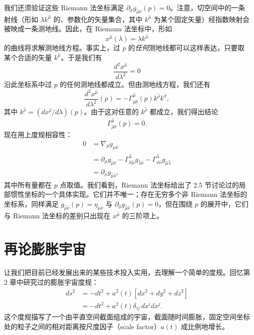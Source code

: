 我们还须验证这些 Riemann 法坐标满足 $\partial_{\hat\sigma}g_{\hat\mu\hat\nu}(p) = 0$。注意，切空间中的一条射线（形如 $\lambda k^{\hat\mu}$ 的、参数化的矢量集合，其中 $k^{\hat\mu}$ 为某个固定矢量）经指数映射会被映成一条测地线。因此，在 Riemann 法坐标中，形如
\begin{equation*}
x^{\hat\mu}(\lambda) = \lambda k^{\hat\mu}
\tag{3.67}
\end{equation*}
的曲线将求解测地线方程。事实上，过 $p$ 的\emph{任何}测地线都可以这样表达，只要取某个合适的矢量 $k^{\hat\mu}$。于是我们有
\begin{equation*}
\frac{d^2x^{\hat\mu}}{d\lambda^2} = 0
\tag{3.68}
\end{equation*}
沿此坐标系中过 $p$ 的任何测地线都成立。但由测地线方程，我们还有
\begin{equation*}
\frac{d^2x^{\hat\mu}}{d\lambda^2}(p) = -\Gamma^{\hat\mu}_{\hat\rho\hat\sigma}(p)k^{\hat\rho}k^{\hat\sigma},
\tag{3.69}
\end{equation*}
其中 $k^{\hat\rho} = (dx^{\hat\rho}/d\lambda)(p)$。由于这对任意的 $k^{\hat\rho}$ 都成立，我们得出结论
\begin{equation*}
\Gamma^{\hat\mu}_{\hat\rho\hat\sigma}(p) = 0.
\tag{3.70}
\end{equation*}
现在用上度规相容性：
\begin{align*}
0 &= \nabla_{\hat\sigma}g_{\hat\mu\hat\nu}\\
&= \partial_{\hat\sigma}g_{\hat\mu\hat\nu} - \Gamma^{\hat\lambda}_{\hat\sigma\hat\mu}g_{\hat\lambda\hat\nu} - \Gamma^{\hat\lambda}_{\hat\sigma\hat\nu}g_{\hat\mu\hat\lambda}\\
&= \partial_{\hat\sigma}g_{\hat\mu\hat\nu},
\tag{3.71}
\end{align*}
其中所有量都在 $p$ 点取值。我们看到，Riemann 法坐标给出了 2.5 节讨论过的局部惯性坐标的一个具体实现。它们并不唯一；存在无穷多个非 Riemann 法坐标的坐标系，同样满足 $g_{\hat\mu\hat\nu}(p) = \eta_{\hat\mu\hat\nu}$ 与 $\partial_{\hat\sigma}g_{\hat\mu\hat\nu}(p) = 0$，但在围绕 $p$ 的展开中，它们与 Riemann 法坐标的差别只出现在 $x^{\hat\mu}$ 的三阶项上。

\section{再论膨胀宇宙}

让我们把目前已经发展出来的某些技术投入实用，去理解一个简单的度规。回忆第 2 章中研究过的膨胀宇宙度规：
\begin{align*}
ds^2 &= -dt^2 + a^2(t)[dx^2 + dy^2 + dz^2]\\
&= -dt^2 + a^2(t)\delta_{ij}\,dx^i dx^j.
\tag{3.72}
\end{align*}
这个度规描写了一个由平直空间截面组成的宇宙，截面随时间膨胀，固定空间坐标处的粒子之间的相对距离按尺度因子（scale factor）$a(t)$ 成比例地增长。

